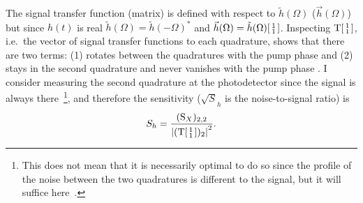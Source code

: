 The signal transfer function (matrix) is defined with respect to $\tilde h(\Omega)$ ($\vec h(\Omega)$) but since $h(t)$ is real $\tilde h(\Omega)=\tilde h(-\Omega)^*$ and $\vec h(\Omega)=\tilde h(\Omega) \begin{bsmallmatrix}1 \\1\end{bsmallmatrix}$.
Inspecting $\text{T}\begin{bsmallmatrix}1 \\1\end{bsmallmatrix}$, i.e.\ the vector of signal transfer functions to each quadrature, shows that there are two terms: (1) rotates between the quadratures with the pump phase and (2) stays in the second quadrature and never vanishes with the pump phase . I consider measuring the second quadrature at the photodetector since the signal is always there~\footnote{This does not mean that it is necessarily optimal to do so since the profile of the noise between the two quadratures is different to the signal, but it will suffice here~\cite{}. }, and therefore the sensitivity ($\sqrt S_h$ is the noise-to-signal ratio) is
\begin{equation}
S_h = \frac{(\text{S}_X)_{2,2}}{\abs{(\text{T}\begin{bsmallmatrix}1 \\1\end{bsmallmatrix})_2}^2}.
\end{equation}


